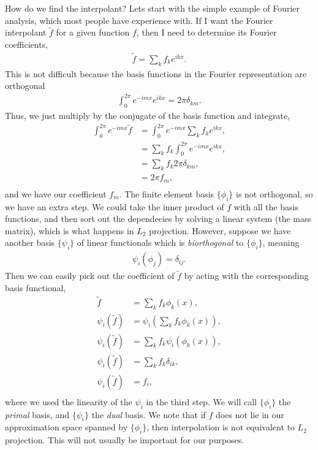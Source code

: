 How do we find the interpolant? Lets start with the simple example of
Fourier analysis, which most people have experience with. If I want
the Fourier interpolant $\tilde f$ for a given function $f$, then I
need to determine its Fourier coefficients,
\begin{align}
  \tilde f = \sum_k f_k e^{i k x}.
\end{align}
This is not difficult because the basis functions in the Fourier
representation are orthogonal
\begin{align}
  \int^{2\pi}_0 e^{-i m x} e^{i k x} = 2\pi \delta_{km}.
\end{align}
Thus, we just multiply by the conjugate of the basis function and integrate,
\begin{align}
  \int^{2\pi}_0 e^{-i m x} \tilde f &= \int^{2\pi}_0 e^{-i m x} \sum_k f_k e^{i k x}, \\
                                  &= \sum_k f_k \int^{2\pi}_0 e^{-i m x} e^{i k x}, \\
                                  &= \sum_k f_k 2\pi \delta_{km}, \\
                                  &= 2\pi f_m, \\
\end{align}
and we have our coefficient $f_m$. The finite element basis
$\{\phi_i\}$ is not orthogonal, so we have an extra step. We could
take the inner product of $f$ with all the basis functions, and then
sort out the dependecies by solving a linear system (the mass matrix),
which is what happens in $L_2$ projection. However, suppose we have
another basis $\{\psi_i\}$ of linear functionals which is
\textit{biorthogonal} to $\{\phi_i\}$, meaning
\begin{align}
  \psi_i(\phi_j) = \delta_{ij}.
\end{align}
Then we can easily pick out the coefficient of $\tilde f$ by acting
with the corresponding basis functional,
\begin{align}
  \tilde f &= \sum_k f_k \phi_k(x),\\
  \psi_i(\tilde f) &= \psi_i(\sum_k f_k \phi_k(x)),\\
  \psi_i(\tilde f) &= \sum_k f_k \psi_i(\phi_k(x)),\\
  \psi_i(\tilde f) &= \sum_k f_k \delta_{ik},\\
  \psi_i(\tilde f) &= f_i,\\
\end{align}
where we used the linearity of the $\psi_i$ in the third step. We will
call $\{\phi_i\}$ the \textit{primal} basis, and $\{\psi_i\}$ the
\textit{dual} basis. We note that if $f$ does not lie in our
approximation space spanned by $\{\phi_i\}$, then interpolation is not
equivalent to $L_2$ projection. This will not usually be important for
our purposes.

